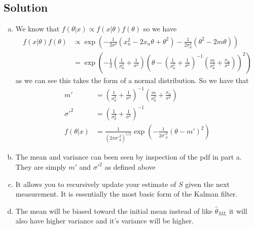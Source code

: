 \documentclass[a4paper]{article}
\begin{document}
\subsection*{Solution}%
\begin{enumerate}[a.]
  \item We know that $f(\theta | x)  \propto f(x | \theta)f(\theta)$ so we have
    \[
      \begin{aligned}
        f(x | \theta)f(\theta) &\propto \exp \left(- \frac{1}{2 \sigma^2} (x_n^2 - 2x_n\theta + \theta^2)  - \frac{1}{2 \sigma_\theta^2} (\theta^2 - 2m\theta)  \right) \\
                               &= \exp \left( -\frac{1}{2} \left(\frac{1}{\sigma_\theta^2} + \frac{1}{\sigma^2} \right) \left( \theta - \left(\frac{1}{\sigma_0^2} + \frac{1}{\sigma^2}  \right)^{-1}\left(\frac{m}{\sigma_\theta^2} + \frac{ x_n}{\sigma^2} \right)\right)^2 \right)
      \end{aligned}
    \]
    as we can see this takes the form of a normal distribution. So we have that
    \[
      \begin{aligned}
        m' &= \left(\frac{1}{\sigma_\theta^2} + \frac{1}{\sigma^2} \right)^{-1}\left(\frac{m}{\sigma_\theta^2} + \frac{x_n}{\sigma^2} \right) \\
        \sigma'^2 &= \left(\frac{1}{\sigma_\theta^2} + \frac{1}{\sigma^2} \right)^{-1} \\ 
        f(\theta | x) &= \frac{1}{(2 \pi \sigma'^2_\theta)^{1/2}} \exp \left( - \frac{1}{2 \sigma'^2_\theta}(\theta - m')^2 \right)
      \end{aligned}
    \]
  \item The mean and variance can been seen by inspection of the pdf in part a. They are simply $m'$ and $\sigma'^2$ as defined above
  \item It allows you to recursively update your estimate of $S$ given the next measurement. It is essentially the most basic form of the Kalman filter.
  \item The mean will be biased toward the initial mean instead of like $\hat{\theta}_{ML}$ it will also have higher variance and it's variance will be higher.
\end{enumerate}
\end{document}
